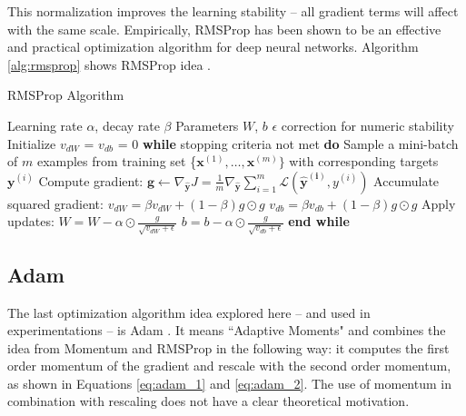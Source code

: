This normalization improves the learning stability -- all gradient terms will affect with the same scale. Empirically, RMSProp has been shown to be an effective and practical optimization algorithm for deep neural networks. Algorithm \ref{alg:rmsprop} shows RMSProp idea \cite{Goodfellow-et-al-2016}.


\begin{algorithm}[!htbp]
	\caption{RMSProp Algorithm}
	\begin{algorithmic}
		\REQUIRE Learning rate $\alpha$, decay rate $\beta$
		\REQUIRE Parameters $W$, $b$
		\REQUIRE $\epsilon$ correction for numeric stability 
		\STATE Initialize $v_{dW}$ = $v_{db}$ = 0
		\STATE \textbf{while} stopping criteria not met \textbf{do}
		\STATE \hspace{5mm} Sample a mini-batch of $m$ examples from training set \{$\boldsymbol{x}^{(1)}, \dots, \boldsymbol{x}^{(m)} \}$ with corresponding targets $\boldsymbol{y}^{(i)}$
		\STATE \hspace{5mm} Compute gradient: 
		 $\boldsymbol{g} \leftarrow \nabla_{\boldsymbol{\hat{y}}}J = \frac{1}{m} \nabla_{\boldsymbol{\hat{y}}}\sum_{i = 1}^{m}\mathcal{L}(\boldsymbol{\hat{y}^{(i)}},y^{(i)})$
		 \STATE \hspace{5mm} Accumulate squared gradient: \STATE \hspace{10mm} $v_{dW} = \beta v_{dW} + (1-\beta) g \odot g$ 
		 \STATE \hspace{10mm} $v_{db} = \beta v_{db} + (1-\beta) g \odot g$
		 \STATE \hspace{5mm} Apply updates:
		 \STATE \hspace{10mm} $W = W - \alpha \odot \frac{g}{\sqrt{v_{dW} + \epsilon}}$ 
		 \STATE \hspace{10mm} $b = b - \alpha \odot \frac{g}{\sqrt{v_{db} + \epsilon}}$ 
		\STATE \textbf{end while}
	\end{algorithmic}
	\label{alg:rmsprop}
\end{algorithm}

\subsection{Adam}

The last optimization algorithm idea explored here -- and used in experimentations -- is Adam \cite{adam2014}. It means ``Adaptive Moments" and combines the idea from Momentum and RMSProp in the following way: it computes the first order momentum of the gradient and rescale with the second order momentum, as shown in Equations \ref{eq:adam_1} and \ref{eq:adam_2}. The use of momentum in combination with rescaling does not have a clear theoretical motivation. 

